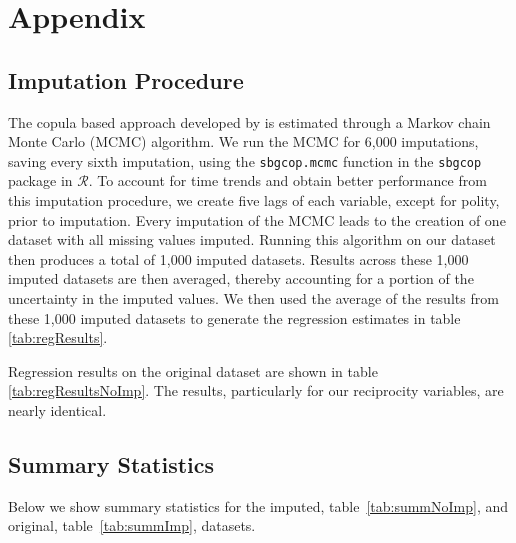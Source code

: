 \newpage
\section*{Appendix}
\label{appendix}

\subsection*{Imputation Procedure}
\label{appImp}

The copula based approach developed by \citet{hoff:2007} is estimated through a Markov chain Monte Carlo (MCMC) algorithm. We run the MCMC for 6,000 imputations, saving every sixth imputation, using the \texttt{sbgcop.mcmc} function in the \texttt{sbgcop} package in $\mathcal{R}$. To account for time trends and obtain better performance from this imputation procedure, we create five lags of each variable, except for polity, prior to imputation. Every imputation of the MCMC leads to the creation of one dataset with all missing values imputed. Running this algorithm on our dataset then produces a total of 1,000 imputed datasets. Results across these 1,000 imputed datasets are then averaged, thereby accounting for a portion of the uncertainty in the imputed values. We then used the average of the results from these 1,000 imputed datasets to generate the regression estimates in table \ref{tab:regResults}. 


\FloatBarrier

Regression results on the original dataset are shown in table \ref{tab:regResultsNoImp}. The results, particularly for our reciprocity variables, are nearly identical. 

\newpage

\subsection*{Summary Statistics}
\label{appSumm}

Below we show summary statistics for the imputed, table~\ref{tab:summNoImp}, and original, table~\ref{tab:summImp}, datasets.


\FloatBarrier


\FloatBarrier

\newpage
